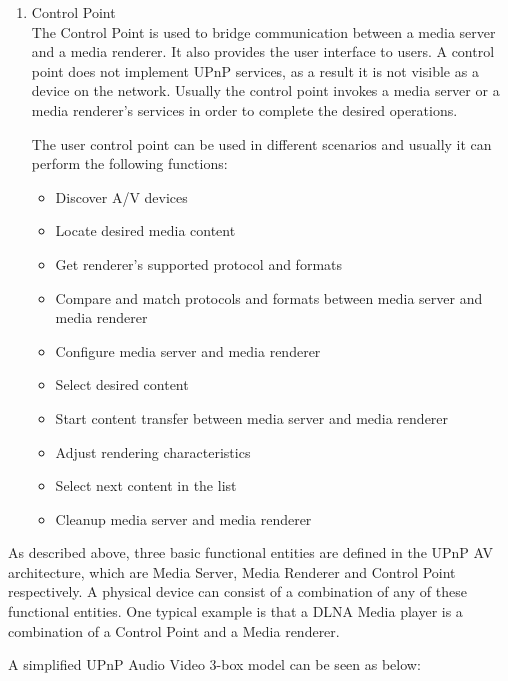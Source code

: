 \begin{enumerate}
\item Control Point \\ 
The Control Point is used to bridge communication between a media server and a media renderer. 
It also provides the user interface to users. A control point does not implement UPnP 
services, as a result it is not visible as a device on the network. Usually the control point 
invokes a media server or a media renderer's services in order to complete the 
desired operations.

The user control point can be used in different scenarios and usually it can 
perform the following functions: 

\begin{itemize} 
\item Discover A/V devices 
\item Locate desired media content 
\item Get renderer's supported protocol and formats 
\item Compare and match protocols and formats between media server and media 
renderer 
\item Configure media server and media renderer 
\item Select desired content 
\item Start content transfer between media server and media renderer 
\item Adjust rendering characteristics 
\item Select next content in the list 
\item Cleanup media server and media renderer 
\end{itemize} 

\end{enumerate} 

As described above, three basic functional entities are defined in the UPnP AV 
architecture\cite{upnp-av}, which are Media Server, Media Renderer and Control Point respectively.
A physical device can consist of a combination of any of these functional 
entities. One typical example is that a DLNA Media player is a combination of a Control 
Point and a Media renderer. 

A simplified UPnP Audio Video 3-box model \cite{DLNA_proxy} can be 
seen as below: 

